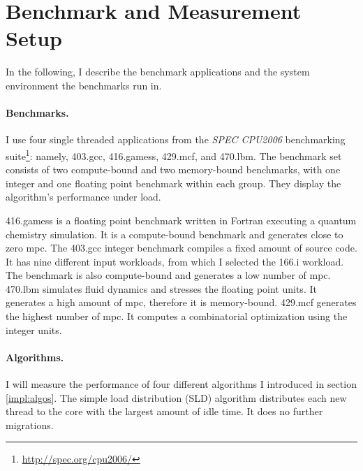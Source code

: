 \section{Benchmark and Measurement Setup}

In the following, I describe the benchmark applications and the
system environment the benchmarks run in.

\paragraph{Benchmarks.}
I use four single threaded applications from the \emph{SPEC CPU2006} benchmarking
suite\footnote{\url{http://spec.org/cpu2006/}}:
namely, 403.gcc, 416.gamess, 429.mcf, and 470.lbm.
The benchmark set consists of two compute-bound and two memory-bound
benchmarks, with one integer and one floating point benchmark within each group.
They display the algorithm's performance under load.

416.gamess is a floating point benchmark written in Fortran executing a quantum
chemistry simulation.
It is a compute-bound benchmark and generates close to zero \gls{mpc}.
The 403.gcc integer benchmark compiles a fixed amount of source code.
It has nine different input workloads, from which I selected the 166.i
workload.
The benchmark is also compute-bound and generates a low number of \gls{mpc}.
470.lbm simulates fluid dynamics and stresses the floating point units.
It generates a high amount of \gls{mpc}, therefore it is memory-bound.
429.mcf generates the highest number of \gls{mpc}.
It computes a combinatorial optimization using the integer units.

\begin{comment}
Besides the SPEC benchmarks, I employ two other applications to prove the
group configuration awareness of the load balancer one the one side, and the
performance benefits for such a configuration on the other side.
To that end, I use a multi-threaded matrix multiplication for a matrix with
one thousand entries and a client-server application printing the number of the
core it currently runs on.

The latter benchmark shows that client and server are migrated together, as
long as there is only one client per task.
If a task spawns several threads, the balancer distributes the additional
threads to other cores.
\end{comment}


\paragraph{Algorithms.}
I will measure the performance of four different algorithms I introduced in
section \ref{impl:algos}.
The simple load distribution (SLD) algorithm distributes each new thread to the
core with the largest amount of idle time.
It does no further migrations.

